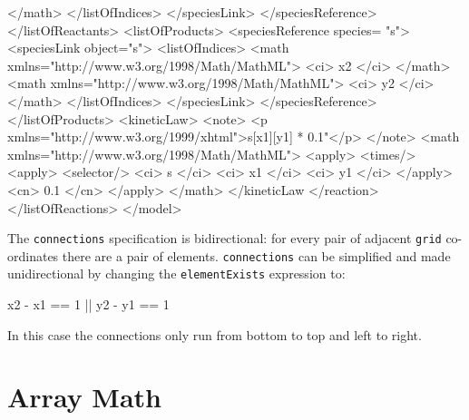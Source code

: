\documentclass{cekarticle}
\begin{document}
\begin{example}
                            </math>
                        </listOfIndices>
                    </speciesLink>
                </speciesReference>
            </listOfReactants>
            <listOfProducts>
                <speciesReference species= "s">
                    <speciesLink object="s">
                        <listOfIndices>
                            <math xmlns="http://www.w3.org/1998/Math/MathML">
                                <ci> x2 </ci>
                            </math>
                            <math xmlns="http://www.w3.org/1998/Math/MathML">
                                <ci> y2 </ci>
                            </math>
                        </listOfIndices>
                    </speciesLink>
                </speciesReference>
            </listOfProducts>
            <kineticLaw>
                <note>
                    <p xmlns="http://www.w3.org/1999/xhtml">s[x1][y1] * 0.1"</p>
                </note>                
                <math xmlns="http://www.w3.org/1998/Math/MathML">
                    <apply>
                        <times/>
                        <apply>
                            <selector/>
                            <ci> s </ci>
                            <ci> x1 </ci>
                            <ci> y1 </ci>
                        </apply>
                        <cn> 0.1 </cn>                            
                    </apply>
                </math>
            </kineticLaw
        </reaction>
    </listOfReactions>
</model>
\end{example}

The \texttt{connections} specification is bidirectional: for every
pair of adjacent \texttt{grid} co-ordinates there are a pair of
elements. \texttt{connections} can be simplified and made
unidirectional by changing the \texttt{elementExists} expression
to:
\begin{example}
x2 - x1 == 1 || y2 - y1 == 1
\end{example}
In this case the connections only run from bottom to top and left
to right.

\section{Array Math}
\label{sec:math}
\end{document}
